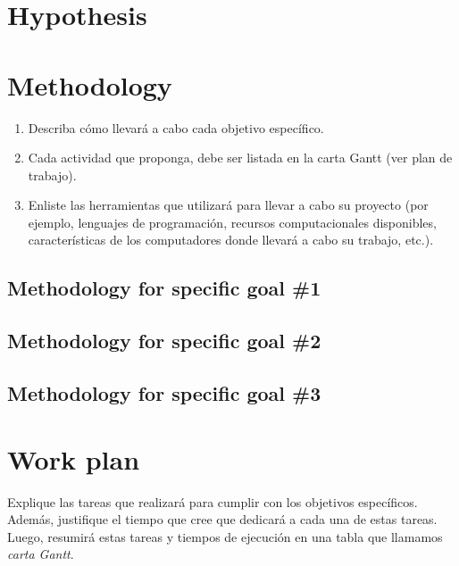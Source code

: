 \documentclass[demo, MAIN.tex]{subfiles}
\begin{document}
\section{Hypothesis}


\section{Methodology}

\begin{enumerate}
\item Describa cómo llevará a cabo cada objetivo específico. 
\item Cada actividad que proponga, debe ser listada en la carta Gantt (ver plan de trabajo).
\item Enliste las herramientas que utilizará para llevar a cabo su proyecto (por ejemplo, lenguajes de programación, recursos computacionales disponibles, características de los computadores donde llevará a cabo su trabajo, etc.).  
\end{enumerate}

\subsection{Methodology for specific goal \#1} 

\subsection{Methodology for specific goal \#2}

\subsection{Methodology for specific goal \#3}


\section{Work plan}

Explique las tareas que realizará para cumplir con los objetivos
específicos. Además, justifique el tiempo que cree que dedicará a cada
una de estas tareas. Luego, resumirá estas tareas y tiempos de
ejecución en una tabla que llamamos \textit{carta Gantt}.
\end{document}
